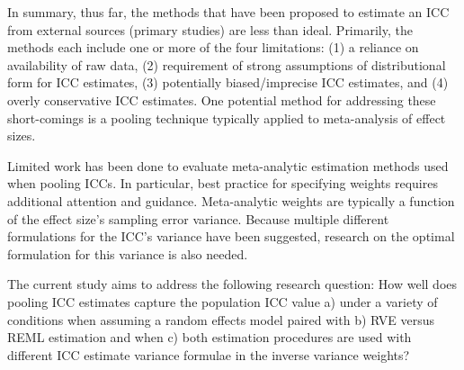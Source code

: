 
In summary, thus far, the methods that have been proposed to estimate an ICC from external sources (primary studies) are less than ideal. Primarily, the methods each include one or more of the four limitations: (1) a reliance on availability of raw data, (2) requirement of strong assumptions of distributional form for ICC estimates, (3) potentially biased/imprecise ICC estimates, and (4) overly conservative ICC estimates. One potential method for addressing these short-comings is a pooling technique typically applied to meta-analysis of effect sizes.  

Limited work has been done to evaluate meta-analytic estimation methods used when pooling ICCs. In particular, best practice for specifying weights requires additional attention and guidance. Meta-analytic weights are typically a function of the effect size's sampling error variance. Because multiple different formulations for the ICC's variance have been suggested, research on the optimal formulation for this variance is also needed.   

The current study aims to address the following research question: How well does pooling ICC estimates capture the population ICC value 
a) under a variety of conditions when assuming a random effects model paired with
b) RVE versus REML estimation and when 
c) both estimation procedures are used with different ICC estimate variance formulae in the inverse variance weights?


